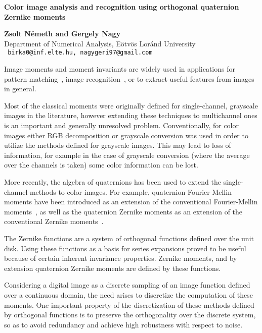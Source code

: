 \documentclass[10pt,a4paper,twoside]{article}
\begin{document}
%
%
\begin{center}{\Large\bf
Color image analysis and recognition using orthogonal quaternion Zernike moments
}\end{center}
%
\begin{center}{\large\bf\noindent
Zsolt N\'emeth and Gergely Nagy
}\\[2mm]
Department of Numerical Analysis, Eötvös Loránd University
\\[1mm]\texttt{
birka0@inf.elte.hu,~nagygeri97@gmail.com
}\end{center}
%
%
\vspace*{7mm}
%
%
Image moments and moment invariants are widely used in applications for pattern matching~\cite{app2}, image recognition~\cite{pattern_recognition}, or to extract useful features from images~\cite{zernike_nn} in general.

Most of the classical moments were originally defined for single-channel, grayscale images in the literature, however extending these techniques to multichannel ones is an important and generally unresolved problem. Conventionally, for color images either RGB decomposition or grayscale conversion was used in order to utilize the methods defined for grayscale images. This may lead to loss of information, for example in the case of grayscale conversion (where the average over the channels is taken) some color information can be lost.

More recently, the algebra of quaternions has been used to extend the single-channel methods to color images. For example, quaternion Fourier-Mellin moments have been introduced as an extension of the conventional Fourier-Mellin moments~\cite{qfmm}, as well as the quaternion Zernike moments as an extension of the conventional Zernike moments~\cite{qzm}.

The Zernike functions are a system of orthogonal functions defined over the unit disk. Using these functions as a basis for series expansions proved to be useful because of certain inherent invariance properties. Zernike moments, and by extension quaternion Zernike moments are defined by these functions.

Considering a digital image as a discrete sampling of an image function defined over a continuous domain, the need arises to discretize the computation of these moments. One important property of the discretization of these methods defined by orthogonal functions is to preserve the orthogonality over the discrete system, so as to avoid redundancy and achieve high robustness with respect to noise.
\end{document}
